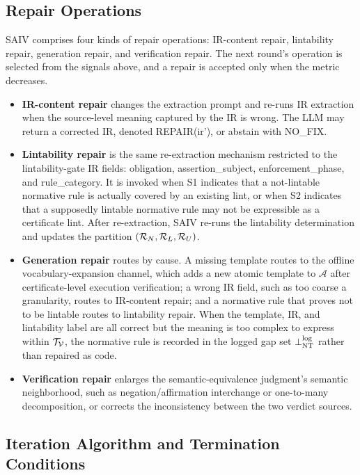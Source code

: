 \subsection{Repair Operations}
\label{subsec:repair}

SAIV comprises four kinds of repair operations: IR-content
repair, lintability repair, generation repair, and verification repair. The
next round's operation is selected from the signals above, and a repair is
accepted only when the metric decreases.

\begin{itemize}
\item \textbf{IR-content repair} changes the extraction prompt
  and re-runs IR extraction when the source-level meaning captured by the IR is
  wrong. The LLM may return a corrected IR, denoted REPAIR(ir'), or
  abstain with NO\_FIX.
\item \textbf{Lintability repair} is the same re-extraction
  mechanism restricted to the lintability-gate IR fields: obligation,
  assertion\_subject, enforcement\_phase, and rule\_category. It is invoked when
  S1 indicates that a not-lintable normative rule is actually covered by an existing lint,
  or when S2 indicates that a supposedly lintable normative rule may not be expressible as
  a certificate lint. After re-extraction, SAIV re-runs the lintability
  determination and updates the partition $(\mathcal{R}_N, \mathcal{R}_L, \mathcal{R}_U)$.
\item \textbf{Generation repair} routes by cause. A missing template routes to the
  offline vocabulary-expansion channel, which adds a new atomic
  template to $\mathcal{A}$ after certificate-level execution verification; a wrong IR field, such as too coarse a granularity,
  routes to IR-content repair; and a normative rule that proves not to be lintable
  routes to lintability repair. When the template, IR, and
  lintability label are all correct but the meaning is too complex to express
  within $\mathcal{T}_{\mathcal{V}}$, the normative rule is recorded in the logged gap set $\bot_{\mathrm{NT}}^{\mathrm{log}}$
  rather than repaired as code.
\item \begingroup\sloppy \textbf{Verification repair} enlarges the semantic-equivalence
  judgment's semantic neighborhood, such as negation/affirmation interchange or
  one-to-many decomposition, or corrects the inconsistency between the two
  verdict sources.\par\endgroup
\end{itemize}

\subsection{Iteration Algorithm and Termination Conditions}
\label{subsec:algo}

